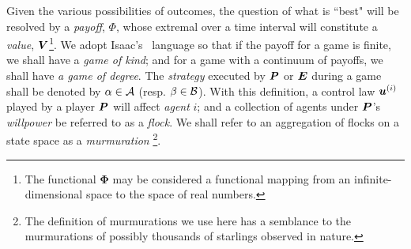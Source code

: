 Given the various possibilities of outcomes, the question of what is ``best" will be resolved by a \textit{payoff}, $\Phi$, whose extremal over a time interval will constitute a \textit{value}, $\bm{V}$\footnote{The functional $\bm{\Phi}$ may be considered a functional mapping from an infinite-dimensional space to the space of real numbers.}. We adopt Isaac's~\cite{Isaacs1965} language so that if the payoff for a game is finite, we shall have a \textit{game of kind}; and for a game with a continuum of payoffs, we shall have \textit{a game of degree}. The \textit{strategy} executed by $\bm{P}$ or $\bm{E}$ during a game shall be denoted by $\alpha \in \mathcal{A}$ (resp. $\beta \in \mathcal{B}$). With this definition, a control law \eg $\bm{u}^{(i)}$ played by a player \eg $\bm{P}$ will affect \textit{agent} $i$; and a collection of agents under $\bm{P}$'s \textit{willpower} be referred to as a \textit{flock}. We shall refer to an aggregation of flocks on a state space as a \textit{murmuration} \footnote{The definition of murmurations we use here has a semblance to the murmurations of possibly thousands of starlings observed in nature.}.
%